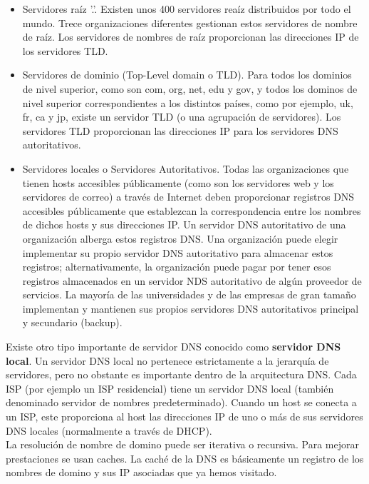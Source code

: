 \documentclass[a4paper,11pt]{article}
\begin{document}
\begin{itemize}
\item Servidores raíz '.'. Existen unos 400 servidores reaíz distribuidos por todo el mundo. Trece organizaciones diferentes gestionan estos servidores de nombre de raíz. Los servidores de nombres de raíz proporcionan las direcciones IP de los servidores TLD.

\item Servidores de dominio (Top-Level domain o TLD). Para todos los dominios de nivel superior, como son com, org, net, edu y gov, y todos los dominos de nivel superior correspondientes a los distintos países, como por ejemplo, uk, fr, ca y jp, existe un servidor TLD (o una agrupación de servidores). Los servidores TLD proporcionan las direcciones IP para los servidores DNS autoritativos.

\item Servidores locales o Servidores Autoritativos. Todas las organizaciones que tienen hosts accesibles públicamente (como son los servidores web y los servidores de correo) a través de Internet deben proporcionar registros DNS accesibles públicamente que establezcan la correspondencia entre los nombres de dichos hosts y sus direcciones IP. Un servidor DNS autoritativo de una organización alberga estos registros DNS. Una organización puede elegir implementar su propio servidor DNS autoritativo para almacenar estos registros; alternativamente, la organización puede pagar por tener esos registros almacenados en un servidor NDS autoritativo de algún proveedor de servicios. La mayoría de las universidades y de las empresas de gran tamaño implementan y mantienen sus propios servidores DNS autoritativos principal y secundario (backup).
\end{itemize}

Existe otro tipo importante de servidor DNS conocido como \textbf{servidor DNS local}. Un servidor DNS local no pertenece estrictamente a la jerarquía de servidores, pero no obstante es importante dentro de la arquitectura DNS. Cada ISP (por ejemplo un ISP residencial) tiene un servidor DNS local (también denominado servidor de nombres predeterminado). Cuando un host se conecta a un ISP, este proporciona al host las direcciones IP de uno o más de sus servidores DNS locales (normalmente a través de DHCP). \\

La resolución de nombre de domino puede ser iterativa o recursiva. Para mejorar prestaciones se usan caches. La caché de la DNS es básicamente un registro de los nombres de domino y sus IP asociadas que ya hemos visitado. \\
\end{document}
